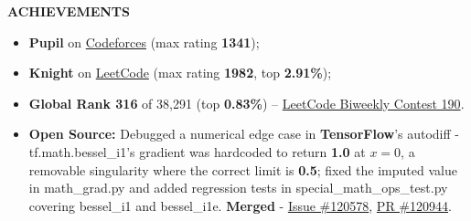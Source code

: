 \documentclass[10pt,article]{article}
\newcommand{\resheading}[1]{{\small \colorbox{mygrey}{\begin{minipage}{\textwidth}\textbf{#1 \vphantom{p\^{E}}}\end{minipage}}}}
\begin{document}
\noindent
\resheading{\textbf{ACHIEVEMENTS}}
\begin{itemize}[noitemsep, leftmargin=*]
\item \textbf{\textcolor{cfpupil}{Pupil}} on \href{https://codeforces.com/profile/i_win_again}{Codeforces} (max rating \textbf{1341}); 
\item \textbf{Knight} on \href{https://leetcode.com/u/idkhowtocodefr/}{LeetCode} (max rating \textbf{1982}, top \textbf{2.91\%});
\item \textbf{Global Rank 316} of 38,291 (top \textbf{0.83\%}) -- \href{https://leetcode.com/contest/biweekly-contest-190/}{LeetCode Biweekly Contest 190}.
\item \textbf{Open Source:} Debugged a numerical edge case in \textbf{TensorFlow}'s autodiff - tf.math.bessel\_i1's gradient was hardcoded to return \textbf{1.0} at $x{=}0$, a removable singularity where the correct limit is \textbf{0.5}; fixed the imputed value in math\_grad.py and added regression tests in special\_math\_ops\_test.py covering bessel\_i1 and bessel\_i1e. \textbf{Merged} - \href{https://github.com/tensorflow/tensorflow/issues/120578}{Issue \#120578}, \href{https://github.com/tensorflow/tensorflow/pull/120944}{PR \#120944}.
\end{itemize}
\end{document}
